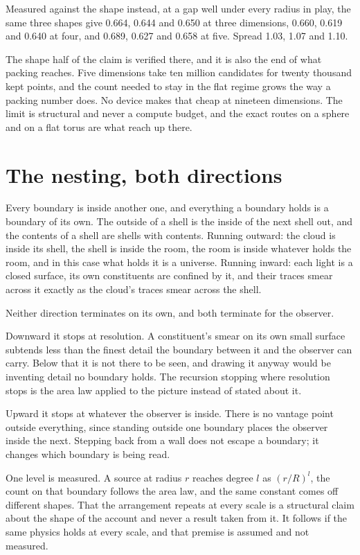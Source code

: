 Measured against the shape instead, at a gap well under every radius in play, the same three shapes
give 0.664, 0.644 and 0.650 at three dimensions, 0.660, 0.619 and 0.640 at four, and 0.689, 0.627
and 0.658 at five. Spread 1.03, 1.07 and 1.10.

The shape half of the claim is verified there, and it is also the end of what packing reaches. Five
dimensions take ten million candidates for twenty thousand kept points, and the count needed to stay
in the flat regime grows the way a packing number does. No device makes that cheap at nineteen
dimensions. The limit is structural and never a compute budget, and the exact routes on a sphere and
on a flat torus are what reach up there.

\section{The nesting, both directions}

Every boundary is inside another one, and everything a boundary holds is a boundary of its own. The
outside of a shell is the inside of the next shell out, and the contents of a shell are shells with
contents. Running outward: the cloud is inside its shell, the shell is inside the room, the room is
inside whatever holds the room, and in this case what holds it is a universe. Running inward: each
light is a closed surface, its own constituents are confined by it, and their traces smear across it
exactly as the cloud's traces smear across the shell.

Neither direction terminates on its own, and both terminate for the observer.

Downward it stops at resolution. A constituent's smear on its own small surface subtends less than
the finest detail the boundary between it and the observer can carry. Below that it is not there
to be seen, and drawing it anyway would be inventing detail no boundary holds. The recursion
stopping where resolution stops is the area law applied to the picture instead of stated about it.

Upward it stops at whatever the observer is inside. There is no vantage point outside everything,
since standing outside one boundary places the observer inside the next. Stepping back from a wall
does not escape a boundary; it changes which boundary is being read.

One level is measured. A source at radius $r$ reaches degree $l$ as $(r/R)^l$, the count on that
boundary follows the area law, and the same constant comes off different shapes. That the
arrangement repeats at every scale is a structural claim about the shape of the account and never a
result taken from it. It follows if the same physics holds at every scale, and that premise is
assumed and not measured.
